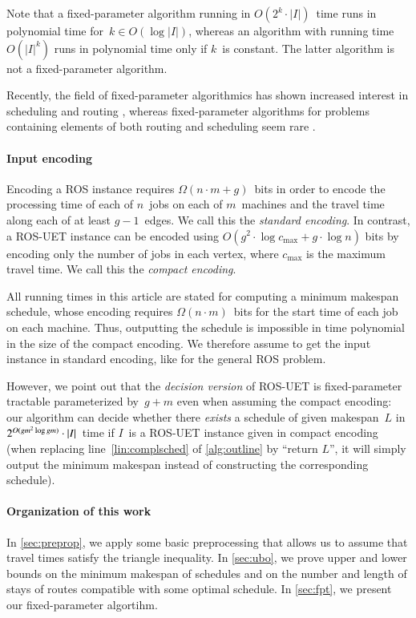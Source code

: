\documentclass[natbib,sort,smallextended,envcountsame,envcountsect,numbook]{svjour3}
\newcommand{\bigO}{O}
\newcommand{\ROS}{\textsc{ROS}}
\newcommand{\ROSUPT}{\textsc{ROS-UET}}
\newcommand{\njobs}{n}
\newcommand{\nmach}{m}
\newcommand{\nverts}{g}
\begin{document}
Note that a fixed-parameter algorithm
running in \(O(2^k\cdot|I|)\)~time
runs in polynomial time for~\(k\in O(\log |I|)\),
whereas an algorithm with running time~\(O(|I|^k)\)
runs in polynomial time only if \(k\)~is constant.
The latter algorithm is not a fixed-parameter algorithm.


Recently, the field of fixed-parameter algorithmics
has shown increased interest in scheduling and routing
\citep{CMY+17,BBB+16b,BCH+15,BMNW15,BNS16,BF95,FM03,HK06,
  HKS+15,MW15,BKS17,BNSW14,DMNW13,GWY17,GJW16,GJS17,GMY13,JMS17,KM14,
  SBNW11,SBNW12},
whereas fixed-parameter algorithms for problems
containing elements of both routing and scheduling
seem rare \citep{BHKK07}.


\paragraph{Input encoding}
Encoding a \ROS{} instance
requires \(\Omega(\njobs\cdot\nmach+g)\)~bits
in order to encode the processing time of each of \(n\)~jobs
on each of \(m\)~machines
and the travel time along each of at least \(g-1\)~edges.
We call this the \emph{standard encoding}.
In contrast, a \ROSUPT{} instance
can be encoded using
\(\bigO(\nverts^2\cdot\log c_{\max}+\nverts\cdot\log\njobs)\) bits
by encoding only the number of jobs in each vertex, where \(c_{\max}\) is the maximum travel time.  We call this the \emph{compact encoding}.

All running times in this article are stated
for computing a minimum makespan schedule,
whose encoding requires \(\Omega(\njobs\cdot\nmach)\)~bits
for the start time of each job on each machine.
Thus,
outputting the schedule is impossible
in time polynomial in the size of the compact encoding.
We therefore assume
to get the input instance in standard encoding,
like for the general \ROS{} problem.


However, we point out that the \emph{decision version} of \ROSUPT{}
is fixed-parameter tractable
parameterized by~\(\nverts+\nmach\)
even when assuming the compact encoding:
our algorithm can decide whether
there \emph{exists} a schedule of given makespan~\(L\)
in \(2^{\smash{\bigO(\nverts\nmach^2\log\nverts\nmach)}}\cdot|I|\)~time
if \(I\)~is a \ROSUPT{} instance given in compact encoding
(when replacing line~\ref{lin:complsched} of \cref{alg:outline}
by ``return $L$'', it will simply output the minimum makespan
instead of constructing the corresponding schedule).

\paragraph{Organization of this work}
In \cref{sec:preprop},
we apply some basic preprocessing
that allows us to
assume  that travel times
satisfy the triangle inequality.
In \cref{sec:ubo},
we prove upper and lower bounds
on the minimum makespan of schedules
and on the number and length of stays
of routes compatible with some optimal schedule.
In \cref{sec:fpt}, we present our fixed-parameter algortihm.
\end{document}
